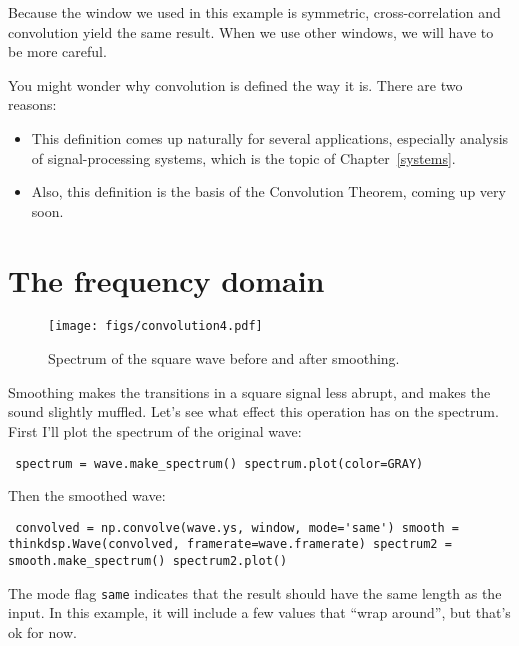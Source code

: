 \documentclass[12pt]{book} \usepackage[width=5.5in,height=8.5in, hmarginratio=3:2,vmarginratio=1:1]{geometry}
\begin{document}
Because the window we used in this example is symmetric, cross-correlation and convolution yield the same result. When we use other windows, we will have to be more careful. 

You might wonder why convolution is defined the way it is. There are two reasons: 

\begin{itemize} 

\item This definition comes up naturally for several applications, especially analysis of signal-processing systems, which is the topic of Chapter~\ref{systems}. 

\item Also, this definition is the basis of the Convolution Theorem, coming up very soon. 

\end{itemize} 

\section{The frequency domain} 

\begin{figure} 

\centerline{\texttt{[image: figs/convolution4.pdf]}} \caption{Spectrum of the square wave before and after smoothing.} \label{fig.convolution4} \end{figure} 

Smoothing makes the transitions in a square signal less abrupt, and makes the sound slightly muffled. Let's see what effect this operation has on the spectrum. First I'll plot the spectrum of the original wave: 

\begin{verbatim} spectrum = wave.make_spectrum() spectrum.plot(color=GRAY) \end{verbatim} 

Then the smoothed wave: 

\begin{verbatim} convolved = np.convolve(wave.ys, window, mode='same') smooth = thinkdsp.Wave(convolved, framerate=wave.framerate) spectrum2 = smooth.make_spectrum() spectrum2.plot() \end{verbatim} 

The mode flag {\tt same} indicates that the result should have the same length as the input. In this example, it will include a few values that ``wrap around'', but that's ok for now. 
\end{document}
